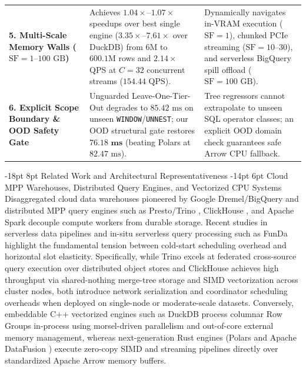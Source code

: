 \documentclass[10pt,a4paper]{article}
\makeatletter
\newenvironment{fitasttable}{%
  \begin{lrbox}{\asttblbox}%
}{%
  \end{lrbox}%
  \sbox{\asttblboxB}{%
    \ifdim\wd\asttblbox>0.96\textwidth
      \resizebox{0.96\textwidth}{!}{\usebox{\asttblbox}}%
    \else
      \usebox{\asttblbox}%
    \fi
  }%
  \ifdim\ht\asttblboxB>0.72\textheight
    \resizebox{!}{0.72\textheight}{\usebox{\asttblboxB}}%
  \else
    \usebox{\asttblboxB}%
  \fi
}
\renewcommand\section{\@startsection{section}{1}{\z@}%
  {-18pt \@plus -4pt \@minus -2pt}%
  {8pt \@plus 2pt}%
  {\normalfont\large\bfseries}}
\renewcommand\subsection{\@startsection{subsection}{2}{\z@}%
  {-14pt \@plus -3pt \@minus -1.5pt}%
  {6pt \@plus 1.5pt}%
  {\normalfont\normalsize\bfseries}}
\makeatother
\begin{document}
\begin{table}[!htbp]
{\begin{fitasttable}
\begin{tabular}{@{}p{2.9cm}p{5.3cm}p{6.8cm}@{}}
\textbf{5. Multi-Scale Memory Walls ($\text{SF}=1\text{--}100\text{ GB}$)} & Achieves $\mathbf{1.04\times\text{--}1.07\times}$ speedups over best single engine ($3.35\times\text{--}7.61\times$ over DuckDB) from $6\text{M}$ to $600.1\text{M}$ rows and $2.14\times$ QPS at $C=32$ concurrent streams ($154.44\text{ QPS}$). & Dynamically navigates in-VRAM execution ($\text{SF}=1$), chunked PCIe streaming ($\text{SF}=10\text{--}30$), and serverless BigQuery spill offload ($\text{SF}=100\text{ GB}$). \\
\textbf{6. Explicit Scope Boundary \& OOD Safety Gate} & Unguarded Leave-One-Tier-Out degrades to $85.42\text{ ms}$ on unseen \texttt{WINDOW}/\texttt{UNNEST}; our OOD structural gate restores $\mathbf{76.18\text{ ms}}$ (beating Polars at $82.47\text{ ms}$). & Tree regressors cannot extrapolate to unseen SQL operator classes; an explicit OOD domain check guarantees safe Arrow CPU fallback. \\
\bottomrule
\end{tabular}
\end{fitasttable}
}
\end{table}

\section{Related Work and Architectural Representativeness}
\subsection{Cloud MPP Warehouses, Distributed Query Engines, and Vectorized CPU Systems}
Disaggregated cloud data warehouses pioneered by Google Dremel/BigQuery \cite{melnik2010dremel, melnik2020dremel} and distributed MPP query engines such as Presto/Trino \cite{sethi2019presto}, ClickHouse \cite{schulze2024clickhouse}, and Apache Spark \cite{ahmed2020hibench} decouple compute workers from durable storage. Recent studies in serverless data pipelines \cite{shojaee2024serverless} and in-situ serverless query processing such as FunDa \cite{lounissi2025funda} highlight the fundamental tension between cold-start scheduling overhead and horizontal slot elasticity. Specifically, while Trino \cite{sethi2019presto} excels at federated cross-source query execution over distributed object stores and ClickHouse \cite{schulze2024clickhouse} achieves high throughput via shared-nothing merge-tree storage and SIMD vectorization across cluster nodes, both introduce network serialization and coordinator scheduling overheads when deployed on single-node or moderate-scale datasets. Conversely, embeddable C++ vectorized engines such as DuckDB \cite{raasveldt2019duckdb, kuiper2024duckdb_ooc} process columnar Row Groups in-process using morsel-driven parallelism and out-of-core external memory management, whereas next-generation Rust engines (Polars and Apache DataFusion \cite{lamb2024datafusion}) execute zero-copy SIMD and streaming pipelines directly over standardized Apache Arrow memory buffers.
\end{document}

